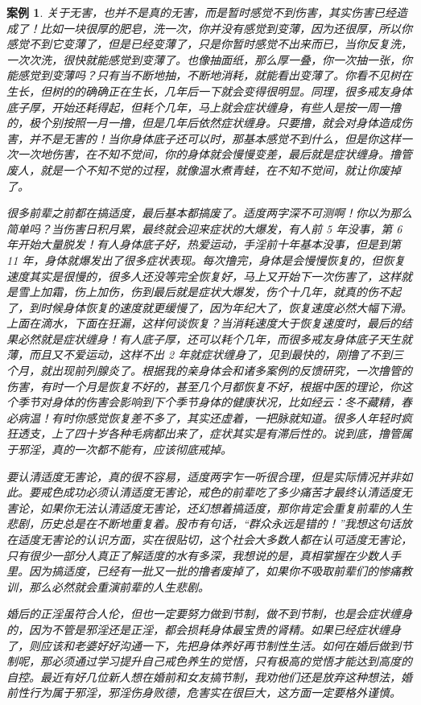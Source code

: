 \documentclass{ctexart}
\newtheorem{case}{案例}
\begin{document}
\begin{case}
    关于无害，也并不是真的无害，而是暂时感觉不到伤害，其实伤害已经造成了！比如一块很厚的肥皂，洗一次，你并没有感觉到变薄，因为还很厚，所以你感觉不到它变薄了，但是已经变薄了，只是你暂时感觉不出来而已，当你反复洗，一次次洗，很快就能感觉到变薄了。也像抽面纸，那么厚一叠，你一次抽一张，你能感觉到变薄吗？只有当不断地抽，不断地消耗，就能看出变薄了。你看不见树在生长，但树的的确确正在生长，几年后一下就会变得很明显。同理，很多戒友身体底子厚，开始还耗得起，但耗个几年，马上就会症状缠身，有些人是按一周一撸的，极个别按照一月一撸，但是几年后依然症状缠身。只要撸，就会对身体造成伤害，并不是无害的！当你身体底子还可以时，那基本感觉不到什么，但是你这样一次一次地伤害，在不知不觉间，你的身体就会慢慢变差，最后就是症状缠身。撸管废人，就是一个不知不觉的过程，就像温水煮青蛙，在不知不觉间，就让你废掉了。

    很多前辈之前都在搞适度，最后基本都搞废了。适度两字深不可测啊！你以为那么简单吗？当伤害日积月累，最终就会迎来症状的大爆发，有人前 5 年没事，第 6 年开始大量脱发！有人身体底子好，热爱运动，手淫前十年基本没事，但是到第 11 年，身体就爆发出了很多症状表现。每次撸完，身体是会慢慢恢复的，但恢复速度其实是很慢的，很多人还没等完全恢复好，马上又开始下一次伤害了，这样就是雪上加霜，伤上加伤，伤到最后就是症状大爆发，伤个十几年，就真的伤不起了，到时候身体恢复的速度就更缓慢了，因为年纪大了，恢复速度必然大幅下滑。上面在滴水，下面在狂漏，这样何谈恢复？当消耗速度大于恢复速度时，最后的结果必然就是症状缠身！有人底子厚，还可以耗个几年，而很多戒友身体底子天生就薄，而且又不爱运动，这样不出 2 年就症状缠身了，见到最快的，刚撸了不到三个月，就出现前列腺炎了。根据我的亲身体会和诸多案例的反馈研究，一次撸管的伤害，有时一个月是恢复不好的，甚至几个月都恢复不好，根据中医的理论，你这个季节对身体的伤害会影响到下个季节身体的健康状况，比如经云：冬不藏精，春必病温！有时你感觉恢复差不多了，其实还虚着，一把脉就知道。很多人年轻时疯狂透支，上了四十岁各种毛病都出来了，症状其实是有滞后性的。说到底，撸管属于邪淫，真的一次都不能有，应该彻底戒掉。

    要认清适度无害论，真的很不容易，适度两字乍一听很合理，但是实际情况并非如此。要戒色成功必须认清适度无害论，戒色的前辈吃了多少痛苦才最终认清适度无害论，如果你无法认清适度无害论，还幻想着搞适度，那你肯定会重复前辈的人生悲剧，历史总是在不断地重复着。股市有句话，“群众永远是错的！”我想这句话放在适度无害论的认识方面，实在很贴切，这个社会大多数人都在认可适度无害论，只有很少一部分人真正了解适度的水有多深，我想说的是，真相掌握在少数人手里。因为搞适度，已经有一批又一批的撸者废掉了，如果你不吸取前辈们的惨痛教训，那么必然就会重演前辈的人生悲剧。

    婚后的正淫虽符合人伦，但也一定要努力做到节制，做不到节制，也是会症状缠身的，因为不管是邪淫还是正淫，都会损耗身体最宝贵的肾精。如果已经症状缠身了，则应该和老婆好好沟通一下，先把身体养好再节制性生活。如何在婚后做到节制呢，那必须通过学习提升自己戒色养生的觉悟，只有极高的觉悟才能达到高度的自控。最近有好几位新人想在婚前和女友搞节制，我劝他们还是放弃这种想法，婚前性行为属于邪淫，邪淫伤身败德，危害实在很巨大，这方面一定要格外谨慎。
\end{case}
\end{document}
